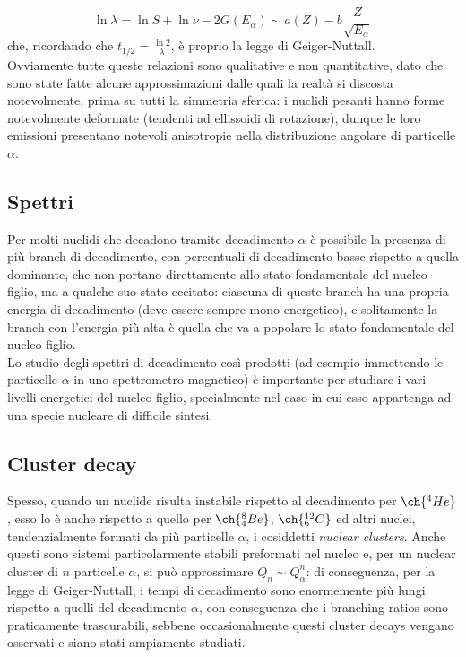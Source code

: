 \begin{equation}
	\ln \lambda = \ln S + \ln \nu - 2 G(E_{\alpha}) \sim a(Z) - b \frac{Z}{\sqrt{E_{\alpha}}}
	\label{eq:2.17}
\end{equation}
che, ricordando che $ t_{1/2} = \frac{\ln 2}{\lambda} $, è proprio la legge di Geiger-Nuttall.\\
Ovviamente tutte queste relazioni sono qualitative e non quantitative, dato che sono state fatte alcune approssimazioni dalle quali la realtà si discosta notevolmente, prima su tutti la simmetria sferica: i nuclidi pesanti hanno forme notevolmente deformate (tendenti ad ellissoidi di rotazione), dunque le loro emissioni presentano notevoli anisotropie nella distribuzione angolare di particelle $ \alpha $.

\subsection{Spettri}

Per molti nuclidi che decadono tramite decadimento $ \alpha $ è possibile la presenza di più branch di decadimento, con percentuali di decadimento basse rispetto a quella dominante, che non portano direttamente allo stato fondamentale del nucleo figlio, ma a qualche suo stato eccitato: ciascuna di queste branch ha una propria energia di decadimento (deve essere sempre mono-energetico), e solitamente la branch con l'energia più alta è quella che va a popolare lo stato fondamentale del nucleo figlio.\\
Lo studio degli spettri di decadimento così prodotti (ad esempio immettendo le particelle $ \alpha $ in uno spettrometro magnetico) è importante per studiare i vari livelli energetici del nucleo figlio, specialmente nel caso in cui esso appartenga ad una specie nucleare di difficile sintesi.

\subsection{Cluster decay}

Spesso, quando un nuclide risulta instabile rispetto al decadimento per $ \ch{^4 He} $, esso lo è anche rispetto a quello per $ \ch{^8_4 Be} $, $ \ch{^{12}_6 C} $ ed altri nuclei, tendenzialmente formati da più particelle $ \alpha $, i cosiddetti \textit{nuclear clusters}. Anche questi sono sistemi particolarmente stabili preformati nel nucleo e, per un nuclear cluster di $ n $ particelle $ \alpha $, si può approssimare $ Q_n \sim Q_{\alpha}^n $: di conseguenza, per la legge di Geiger-Nuttall, i tempi di decadimento sono enormemente più lungi rispetto a quelli del decadimento $ \alpha $, con conseguenza che i branching ratios sono praticamente trascurabili, sebbene occasionalmente questi cluster decays vengano osservati e siano stati ampiamente studiati.

